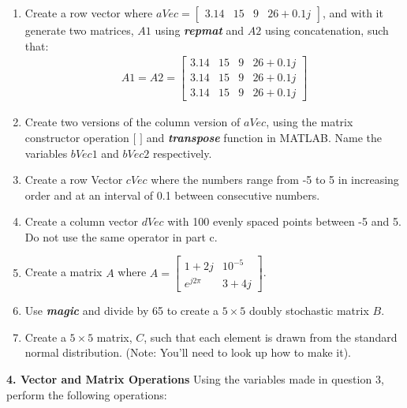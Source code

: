\documentclass[11pt]{article}
\newenvironment{qparts}{\begin{enumerate}[{(}a{)}]}{\end{enumerate}}
\begin{document}
\begin{qparts}
\item
Create a row vector where 
$ aVec = \begin{bmatrix}3.14&15&9&26+0.1j\end{bmatrix}$,
and with it generate two matrices, $A1$ using \textbf{\textit{repmat}}
and $A2$ using concatenation, such that:
\begin{align*}
A1 = A2 = \begin{bmatrix}3.14&15&9& 26+0.1j \\ 3.14&15&9&26+0.1j\\3.14&15&9&26+0.1j\end{bmatrix}
\end{align*}

\item
Create two versions of the column version of $aVec$,
using the matrix constructor operation $[$ $]$ and
\textbf{\textit{transpose}} function in MATLAB.
Name the variables $bVec1$ and $bVec2$ respectively.

\item  
Create a row Vector $cVec$ where the numbers range from -5 to 5
in increasing order and at an interval of 0.1 between consecutive numbers.

\item
Create a column vector $dVec$ with 100 evenly spaced points between -5 and 5.
Do not use the same operator in part c.

\item
Create a matrix $A$ where 
$A = \begin{bmatrix} 1+2j&10^{-5}\\ e^{j2\pi}&3+4j \end{bmatrix}$.

\item
Use \textbf{\textit{magic}} and divide by 65 to create a $5 \times 5$
doubly stochastic matrix $B$.

\item
Create a $5 \times 5$ matrix, $C$,
such that each element is drawn from the standard normal distribution.
(Note: You'll need to look up how to make it).

\end{qparts}

\noindent \textbf{4. Vector and Matrix Operations}
Using the variables made in question 3,
perform the following operations:
\end{document}
